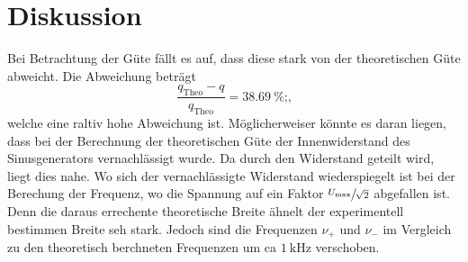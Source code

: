 \section{Diskussion}
\label{sec:Diskussion}
Bei Betrachtung der Güte fällt es auf, dass diese stark von der theoretischen  Güte abweicht.
Die Abweichung beträgt
\begin{equation}
    \frac{ q_\text{Theo} - q}{q_\text{Theo}} = \SI{38.69}{\percent} \text{;} \text{,}
\end{equation}
welche eine raltiv hohe Abweichung ist. Möglicherweiser könnte es daran liegen, dass bei der Berechnung der theoretischen Güte der Innenwiderstand des
Sinusgenerators vernachlässigt wurde. Da durch den Widerstand geteilt wird, liegt dies nahe.
Wo sich der vernachlässigte Widerstand wiederspiegelt ist bei der Berechung der Frequenz, wo die Spannung auf ein Faktor 
$\sfrac{U_\text{max}}{\sqrt{2}}$ abgefallen ist. Denn die daraus errechente theoretische Breite ähnelt der experimentell bestimmen Breite seh stark.
Jedoch sind die Frequenzen $\nu_+$ und $\nu_-$ im Vergleich zu den theoretisch berchneten Frequenzen um ca $\SI{1}{\kilo\hertz}$ verschoben.